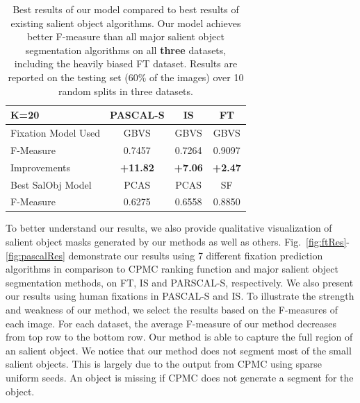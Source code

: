 \begin{table}
\begin{center}
\begin{tabular} {l| c c c}
\hline
\hline
K=20                    & PASCAL-S    & IS     & FT \\
\hline
Fixation Model Used     & GBVS      & GBVS    & GBVS\\
F-Measure               & 0.7457    & 0.7264 & 0.9097\\
Improvements            & \textbf{+11.82}    & \textbf{+7.06}  & \textbf{+2.47} \\
\hline
Best SalObj Model       & PCAS      & PCAS   & SF \\
F-Measure               & 0.6275    & 0.6558 & 0.8850 \\
\hline
\hline
\end{tabular}
\caption{Best results of our model compared to best results of existing salient object algorithms.  Our model achieves better F-measure than all major salient object segmentation algorithms on all \textbf{three} datasets, including the heavily biased FT dataset. Results are reported on the testing set ($60\%$ of the images) over 10 random splits in three datasets.} \label{tab:scores}
\end{center}
\end{table}

To better understand our results, we also provide qualitative visualization of salient object masks generated by our methods as well as others. Fig.~\ref{fig:ftRes}-\ref{fig:pascalRes} demonstrate our results using 7 different fixation prediction algorithms in comparison to CPMC ranking function and major salient object segmentation methods, on FT, IS and PARSCAL-S, respectively. We also present our results using human fixations in PASCAL-S and IS.  To illustrate the strength and weakness of our method, we select the results based on the F-measures of each image. For each dataset, the average F-measure of our method decreases from top row to the bottom row. Our method is able to capture the full region of an salient object.  We notice that our method does not segment most of the small salient objects. This is largely due to the output from CPMC using sparse uniform seeds. An object is missing if CPMC does not generate a segment for the object.







